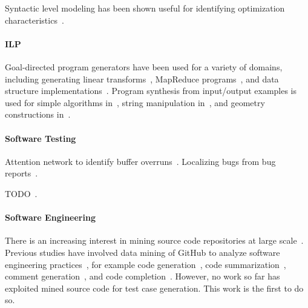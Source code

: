 Syntactic level modeling has been shown useful for identifying optimization characteristics~\cec{[PACT'17]}.

\paragraph{ILP} Goal-directed program generators have been used for a variety of domains, including generating linear transforms~\cite{Voronenko2009}, MapReduce programs~\cite{Smith}, and data structure implementations~\cite{Loncaric2016}. Program synthesis from input/output examples is used for simple algorithms in~\cite{Zaremba2015a}, string manipulation in~\cite{Gulwani2011}, and geometry constructions in~\cite{Gulwani2012}.

\paragraph{Software Testing} Attention network to identify buffer overruns~\cite{Choi2016}. Localizing bugs from bug reports~\cite{Lam2016,Huo2016}.

TODO~\cite{White2016}.

\paragraph{Software Engineering} There is an increasing interest in mining source code repositories at large scale~\cite{Allamanis2013a,White2015a,Bird2009}. Previous studies have involved data mining of GitHub to analyze software engineering practices~\cite{Wu2014,Guzman2014,Baishakhi2014a,Vasilescu2015}, for example code generation~\cite{Zhang2015a}, code summarization~\cite{Allamanis2016}, comment generation~\cite{Wong2013}, and code completion~\cite{Raychev2014}. However, no work so far has exploited mined source code for test case generation. This work is the first to do so.